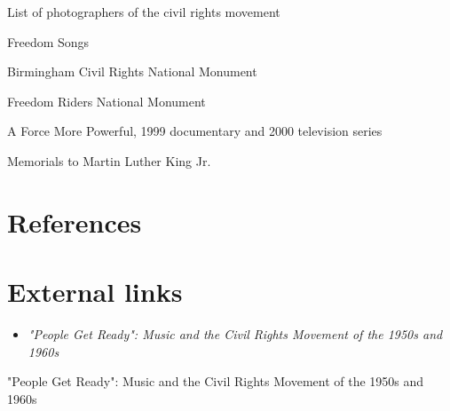 List of photographers of the civil rights movement

Freedom Songs

Birmingham Civil Rights National Monument

Freedom Riders National Monument

A Force More Powerful, 1999 documentary and 2000 television series

Memorials to Martin Luther King Jr.

\section{References}\label{references}

\section{External links}\label{external-links}

\begin{itemize}
\item
  \emph{"People Get Ready": Music and the Civil Rights Movement of the
  1950s and 1960s}
\end{itemize}

"People Get Ready": Music and the Civil Rights Movement of the 1950s and
1960s
